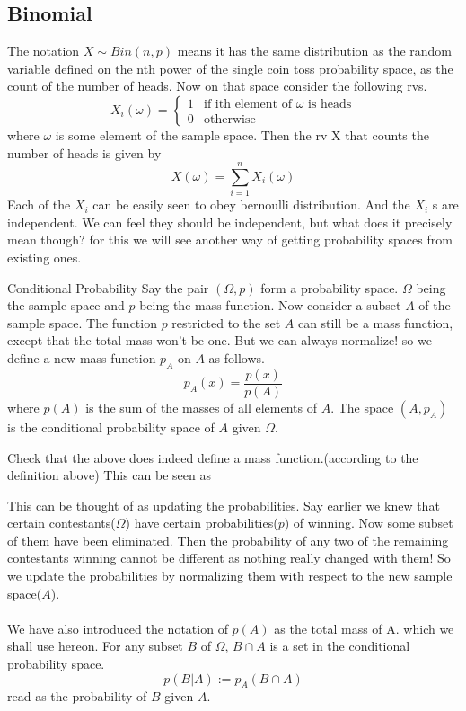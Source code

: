 \documentclass{myclass}
\begin{document}
\subsection*{Binomial}
The notation $X\sim Bin(n,p)$ means it has the same distribution as the random variable defined on the nth power of the single coin toss probability space, as the count of the number of heads.
Now on that space consider the following rvs.
$$X_i(\omega)=\begin{cases}
    1 & \text{if ith element of }\omega\text{ is heads}\\
    0 & \text{otherwise}
\end{cases}$$
where $\omega$ is some element of the sample space. Then the rv X that counts the number of heads is given by $$X(\omega)=\sum_{i=1}^n X_i(\omega)$$
Each of the $X_i$ can be easily seen to obey bernoulli distribution. And the $X_i$ s are independent. We can feel they should be independent, but what does it precisely mean though? for this we will see another way of getting probability spaces from existing ones.
\begin{bluthm}{Conditional Probability}
    Say the pair $(\Omega,p)$ form a probability space. $\Omega$ being the sample space and $p$ being the mass function. Now consider a subset $A$ of the sample space. The function $p$ restricted to the set $A$ can still be a mass function, except that the total mass won't be one.
    But we can always normalize! so we define a new mass function $p_A$ on $A$ as follows.
    $$p_A(x)=\frac{p(x)}{p(A)}$$
    where $p(A)$ is the sum of the masses of all elements of $A$. The space $(A,p_A)$ is the conditional probability space of $A$ given $\Omega$.
\end{bluthm}
\begin{exe}
Check that the above does indeed define a mass function.(according to the definition above)
This can be seen as 
\end{exe}

This can be thought of as updating the probabilities. Say earlier we knew that certain contestants($\Omega$) have certain probabilities($p$) of winning. Now some subset of them have been eliminated. Then the  probability
of any two of the remaining contestants winning cannot be different as nothing really changed with them! So we update the probabilities by normalizing them with respect to the new sample space($A$).
\\ \\
We have also introduced the notation of $p(A)$ as the total mass of A. which we shall use hereon. For any subset $B$ of $\Omega$, $B\cap A$ is a set in the conditional probability space. $$p(B|A):=p_A(B\cap A)$$
read as the probability of $B$ given $A$. 
\end{document}
